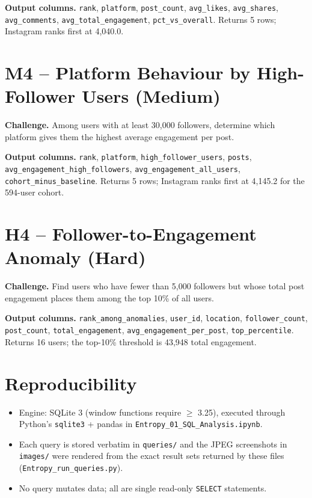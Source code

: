 \documentclass[11pt,a4paper]{article}
\begin{document}


\textbf{Output columns.} \texttt{rank}, \texttt{platform}, \texttt{post\_count}, \texttt{avg\_likes}, \texttt{avg\_shares}, \texttt{avg\_comments}, \texttt{avg\_total\_engagement}, \texttt{pct\_vs\_overall}. Returns 5 rows; Instagram ranks first at 4,040.0.

\section{M4 -- Platform Behaviour by High-Follower Users (Medium)}

\textbf{Challenge.} Among users with at least 30,000 followers, determine which platform gives them the highest average engagement per post.



\textbf{Output columns.} \texttt{rank}, \texttt{platform}, \texttt{high\_follower\_users}, \texttt{posts}, \texttt{avg\_engagement\_high\_followers}, \texttt{avg\_engagement\_all\_users}, \texttt{cohort\_minus\_baseline}. Returns 5 rows; Instagram ranks first at 4,145.2 for the 594-user cohort.

\section{H4 -- Follower-to-Engagement Anomaly (Hard)}

\textbf{Challenge.} Find users who have fewer than 5,000 followers but whose total post engagement places them among the top 10\% of all users.



\textbf{Output columns.} \texttt{rank\_among\_anomalies}, \texttt{user\_id}, \texttt{location}, \texttt{follower\_count}, \texttt{post\_count}, \texttt{total\_engagement}, \texttt{avg\_engagement\_per\_post}, \texttt{top\_percentile}. Returns 16 users; the top-10\% threshold is 43,948 total engagement.

\section{Reproducibility}

\begin{itemize}[leftmargin=*]
  \item Engine: SQLite 3 (window functions require $\geq$ 3.25), executed through Python's \texttt{sqlite3} + pandas in \texttt{Entropy\_01\_SQL\_Analysis.ipynb}.
  \item Each query is stored verbatim in \texttt{queries/} and the JPEG screenshots in \texttt{images/} were rendered from the exact result sets returned by these files (\texttt{Entropy\_run\_queries.py}).
  \item No query mutates data; all are single read-only \texttt{SELECT} statements.
\end{itemize}
\end{document}
